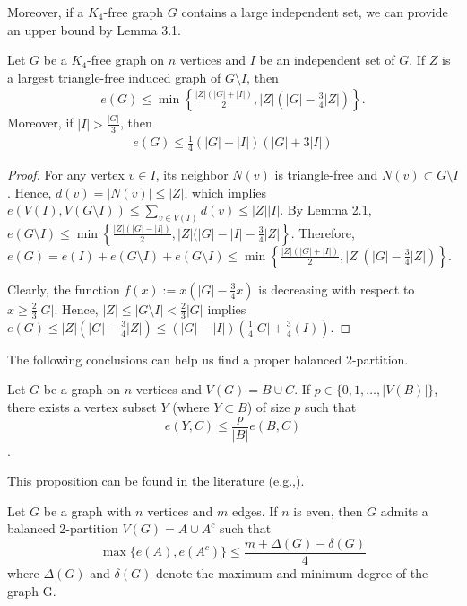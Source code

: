 \documentclass[11pt, oneside]{article}   	%
\begin{document}
Moreover, if a $K_4$-free graph $G$ contains a large independent set, we can provide an upper bound by Lemma 3.1.

\begin{lemma}
    Let $G$ be a $K_4$-free graph on $n$ vertices and $I$ be an independent set of $G$. If $Z$ is a largest triangle-free induced graph of $G\setminus I$, then 
    \begin{align}
        e(G)\leq \min\left\{\frac{|Z|(|G|+|I|)}{2},|Z|(|G|-\frac 3 4|Z|)\right\}.
    \end{align}
    Moreover, if $|I|>\frac{|G|}{3}$, then
    \begin{align}
        e(G)\leq \frac{1}{4}(|G|-|I|)(|G|+3|I|)
    \end{align}
\end{lemma}

\begin{proof}
    For any vertex $v\in I$, its neighbor $N(v)$ is triangle-free and $N(v)\subset G\setminus I$. Hence, $d(v)=|N(v)|\leq |Z|$, which implies $e(V(I),V(G\setminus I))\leq \sum\limits_{v\in V(I)}d(v) \leq |Z||I|$. By Lemma 2.1, $e(G\setminus I)\leq \min\left\{\frac{|Z|(|G|-|I|)}{2},|Z|(|G|-|I|-\frac{3}{4} |Z|\right\}$. Therefore, $e(G)=e(I)+e(G\setminus I)+e(G\setminus I)\leq \min\left\{\frac{|Z|(|G|+|I|)}{2},|Z|(|G|-\frac 3 4|Z|)\right\}$.

    Clearly, the function $f(x):=x(|G|-\frac 3 4 x)$ is decreasing with respect to $x\geq \frac{2}{3}|G|$. Hence, $|Z|\leq|G\setminus I|<\frac 2 3|G|$ implies $e(G)\leq  |Z|(|G|-\frac 3 4|Z|)\leq (|G|-|I|)(\frac 1 4 |G|+\frac 3 4(I))$.
\end{proof}

The following conclusions can help us find a proper balanced 2-partition.
\begin{Prop}
    Let $G$ be a graph on $n$ vertices and $V(G)=B\cup C$. If $ p\in\{0,1,\ldots,|V(B)|\}$, there exists a vertex subset $Y$ (where $Y\subset B$) of size $p$ such that $$e(Y,C)\leq \frac{p}{|B|}e(B,C)$$. 
\end{Prop}
This proposition can be found in the literature (e.g.,\cite{krivelevich1995}).

\begin{Th}\cite{xu2010}
    Let $G$ be a graph with $n$ vertices and $m$ edges. If $n$ is even,
then $G$ admits a balanced 2-partition $V(G)=A\cup A^c$ such that
$$
\max\{e(A), e(A^c)\} \leq \frac{m  + \Delta(G) - \delta(G)}{4}
$$
where $\Delta(G)$ and $\delta(G)$ denote the maximum and minimum degree of the graph G.
\end{Th}
     
\end{document}
